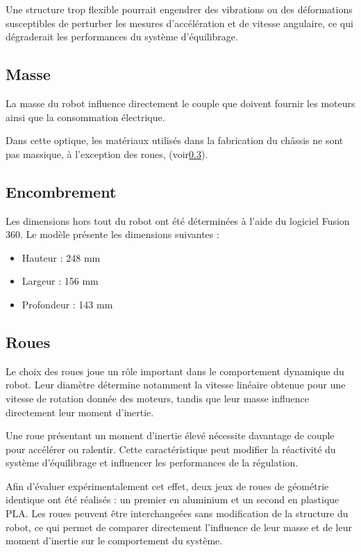 Une structure trop flexible pourrait engendrer des vibrations ou des déformations susceptibles de perturber les mesures d'accélération et de vitesse angulaire, ce qui dégraderait les performances du système d'équilibrage.
\subsection{Masse}

La masse du robot influence directement le couple que doivent fournir les moteurs ainsi que la consommation électrique.

Dans cette optique, les matériaux utilisés dans la fabrication du châssis ne sont pas massique, à l'exception des roues, (voir\ref{subsection:roues}).

\subsection{Encombrement}

Les dimensions hors tout du robot ont été déterminées à l'aide du logiciel Fusion 360. 
Le modèle présente les dimensions suivantes :

\begin{itemize}
    \item Hauteur : 248 mm
    \item Largeur : 156 mm
    \item Profondeur : 143 mm
\end{itemize}

\subsection{Roues}
\label{subsection:roues}

Le choix des roues joue un rôle important dans le comportement dynamique du robot. Leur diamètre détermine notamment la vitesse linéaire obtenue pour une vitesse de rotation donnée des moteurs, tandis que leur masse influence directement leur moment d'inertie.

Une roue présentant un moment d'inertie élevé nécessite davantage de couple pour accélérer ou ralentir. Cette caractéristique peut modifier la réactivité du système d'équilibrage et influencer les performances de la régulation.

Afin d'évaluer expérimentalement cet effet, deux jeux de roues de géométrie identique ont été réalisés : un premier en aluminium et un second en plastique PLA. Les roues peuvent être interchangeées sans modification de la structure du robot, ce qui permet de comparer directement l'influence de leur masse et de leur moment d'inertie sur le comportement du système.

